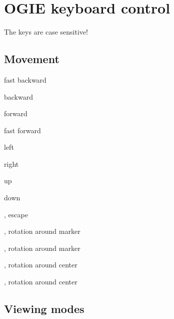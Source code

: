 \newenvironment{hkkeys}
    {\begin{list}{}
        {
        \setlength{\leftmargin}{9em}
        \setlength{\labelwidth}{8em}
        \setlength{\labelsep}{2em}
        \setlength{\parsep}{0em}
        \setlength{\itemsep}{0.5ex}
        }
    }
    {\end{list}}


\section{OGIE keyboard control}
\label{keys}

The keys are case sensitive!

\subsection*{Movement}

\begin{hkkeys}
\item[\keys{a}]        fast backward
\item[\keys{s}]        backward
\item[\keys{g}]        forward
\item[\keys{space}]    fast forward
\item[\keys{d}]        left
\item[\keys{f}]        right
\item[\keys{t}]        up
\item[\keys{z}]        down
\item[\keys{q}, \keys{esc}]    escape
\item[\keys{\arrowkeyleft}, \keys{\arrowkeyright}] rotation around marker
\item[\keys{\arrowkeyup}, \keys{\arrowkeydown}] rotation around marker
\item[\keys{\shift+\arrowkeyleft}, \keys{\shift+\arrowkeyright}]
            rotation around center
\item[\keys{\shift+\arrowkeyup}, \keys{\shift+\arrowkeydown}]
            rotation around center

\end{hkkeys}



\subsection*{Viewing modes}


